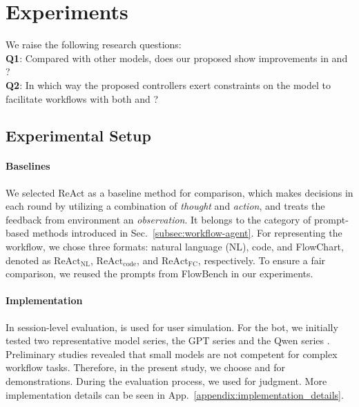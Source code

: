 \figRadar 
\tableAblation


\section{Experiments} \label{sec:experiments}

We raise the following research questions: \\
\textbf{Q1}:
Compared with other models, does our proposed \model show improvements in \ofollow and \oflex? \\
\textbf{Q2}:
In which way the proposed controllers exert constraints on the model to facilitate workflows with both \ofollow and \oflex? \\


\subsection{Experimental Setup} \label{subsec:experimental_setup}

\paragraph{Baselines}
We selected ReAct \citep{ReAct} as a baseline method for comparison, which makes decisions in each round by utilizing a combination of \textit{thought} and \textit{action}, and treats the feedback from environment an \textit{observation}. It belongs to the category of prompt-based methods introduced in Sec.~\ref{subsec:workflow-agent}. For representing the workflow, we chose three formats: natural language (NL), code, and FlowChart, denoted as $\text{ReAct}_{\text{NL}}$, $\text{ReAct}_{\text{code}}$, and $\text{ReAct}_{\text{FC}}$, respectively. To ensure a fair comparison, we reused the prompts from FlowBench \citep{FlowBench} in our experiments.

\paragraph{Implementation}
In session-level evaluation,  is used for user simulation. For the bot, we initially tested two representative model series, the GPT series \citep{GPT-4} and the Qwen series \citep{Qwen2}.
Preliminary studies revealed that small models are not competent for complex workflow tasks.
Therefore, in the present study, we choose  and  for demonstrations.
During the evaluation process, we used  for judgment.
More implementation details can be seen in App.~\ref{appendix:implementation_details}.


